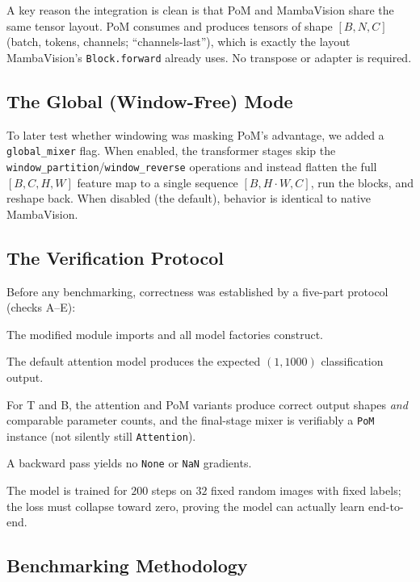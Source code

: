 \documentclass[11pt,a4paper]{article}
\begin{document}
A key reason the integration is clean is that PoM and MambaVision share the same tensor layout. PoM consumes and produces tensors of shape $[B, N, C]$ (batch, tokens, channels; ``channels-last''), which is exactly the layout MambaVision's \texttt{Block.forward} already uses. No transpose or adapter is required.

\subsection{The Global (Window-Free) Mode}

To later test whether windowing was masking PoM's advantage, we added a \texttt{global\_mixer} flag. When enabled, the transformer stages skip the \texttt{window\_partition}/\texttt{window\_reverse} operations and instead flatten the full $[B, C, H, W]$ feature map to a single sequence $[B, H{\cdot}W, C]$, run the blocks, and reshape back. When disabled (the default), behavior is identical to native MambaVision.

\subsection{The Verification Protocol}

Before any benchmarking, correctness was established by a five-part protocol (checks A--E):
\begin{description}[leftmargin=1.5em, nosep, style=nextline]
    \item[A. Import.] The modified module imports and all model factories construct.
    \item[B. Baseline forward.] The default attention model produces the expected $(1, 1000)$ classification output.
    \item[C. Matched-budget comparison.] For T and B, the attention and PoM variants produce correct output shapes \emph{and} comparable parameter counts, and the final-stage mixer is verifiably a \texttt{PoM} instance (not silently still \texttt{Attention}).
    \item[D. Gradient flow.] A backward pass yields no \texttt{None} or \texttt{NaN} gradients.
    \item[E. Over-fitting sanity check.] The model is trained for $200$ steps on $32$ fixed random images with fixed labels; the loss must collapse toward zero, proving the model can actually learn end-to-end.
\end{description}

\subsection{Benchmarking Methodology}
\end{document}
